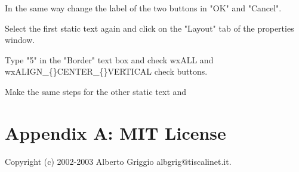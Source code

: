 \documentclass[a4paper,10pt]{book}
\begin{document}
                                                    
                                                    
                                                    
                                                    In the same way change the label of the two buttons in "OK" and
                                                     "Cancel". 
                                                    
                                                    
                                                    
                                                    
                                                    
                                                    Select the first static text again and click on the "Layout"
                                                     tab of the properties window.
                                                    
                                                    
                                                    
                                                    
                                                    Type "5" in the "Border" text box and check wxALL and wxALIGN\_\{\}CENTER\_\{\}VERTICAL
                                                     check buttons.
                                                    
                                                    
                                                    Make the same steps for the other static text and
                                                    
                                                    
                                                    
                                                    \newpage

\appendix

\chapter{Appendix A: MIT License}
                                                        Copyright (c) 2002-2003 Alberto Griggio  albgrig@tiscalinet.it.
                                                        
\end{document}
